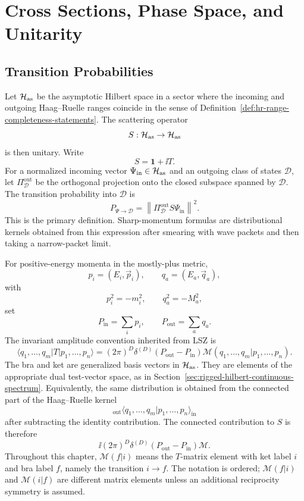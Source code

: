 \chapter{Cross Sections, Phase Space, and Unitarity}
\label{ch:cross-sections-unitarity}
\ConventionsLorentzian


\section{Transition Probabilities}

\begin{definition}
\label{def:scattering-transition-probability-event-class}
Let \(\mathcal H_{\rm as}\) be the asymptotic Hilbert space in a sector where
the incoming and outgoing Haag--Ruelle ranges coincide in the sense of
Definition~\ref{def:hr-range-completeness-statements}.  The scattering
operator
\[
  S:\mathcal H_{\rm as}\to\mathcal H_{\rm as}
\]
is then unitary.  Write
\[
  S=\mathbf 1+\ii T .
\]
For a normalized incoming vector \(\Psi_{\mathrm{in}}\in\mathcal H_{\rm as}\) and
an outgoing class of states \(\mathcal D\), let
\(\Pi_{\mathcal D}^{\mathrm{out}}\) be the orthogonal projection onto the closed
subspace spanned by \(\mathcal D\).  The transition probability into
\(\mathcal D\) is
\[
  P_{\Psi\to\mathcal D}
  =
  \left\|
    \Pi_{\mathcal D}^{\mathrm{out}}S\Psi_{\mathrm{in}}
  \right\|^2 .
\]
This is the primary definition.  Sharp-momentum formulas are distributional
kernels obtained from this expression after smearing with wave packets and
then taking a narrow-packet limit.
\end{definition}

\begin{definition}
\label{def:invariant-amplitude-convention}
For positive-energy momenta in the mostly-plus metric,
\[
  p_i=(E_i,\vec p_i),
  \qquad
  q_a=(E_a,\vec q_a),
\]
with
\[
  p_i^2=-m_i^2,\qquad q_a^2=-M_a^2,
\]
set
\[
  P_{\mathrm{in}}=\sum_i p_i,
  \qquad
  P_{\mathrm{out}}=\sum_a q_a .
\]
The invariant amplitude convention inherited from LSZ is
\[
  \langle q_1,\ldots,q_m|T|p_1,\ldots,p_n\rangle
  =
  (2\pi)^D\delta^{(D)}(P_{\mathrm{out}}-P_{\mathrm{in}})
  \mathcal M(q_1,\ldots,q_m|p_1,\ldots,p_n).
\]
The bra and ket are generalized basis vectors in \(\mathcal H_{\rm as}\).
They are elements of the appropriate dual test-vector space, as in
Section~\ref{sec:rigged-hilbert-continuous-spectrum}. Equivalently, the same
distribution is obtained from the connected part of the Haag--Ruelle kernel
\[
  {}_{\mathrm{out}}\langle q_1,\ldots,q_m|p_1,\ldots,p_n\rangle_{\mathrm{in}}
\]
after subtracting the identity contribution.  The connected contribution to
\(S\) is therefore
\[
  \ii(2\pi)^D\delta^{(D)}(P_{\mathrm{out}}-P_{\mathrm{in}})\mathcal M .
\]
Throughout this chapter, \(\mathcal M(f|i)\) means the \(T\)-matrix element
with ket label \(i\) and bra label \(f\), namely the transition \(i\to f\).
The notation is ordered; \(\mathcal M(f|i)\) and \(\mathcal M(i|f)\) are
different matrix elements unless an additional reciprocity symmetry is
assumed.
\end{definition}

